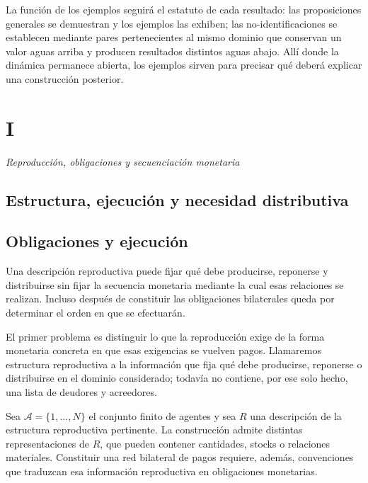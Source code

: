 \documentclass[10pt,a5paper,twoside]{article}
\begin{document}
La función de los ejemplos seguirá el estatuto de cada resultado: las
proposiciones generales se demuestran y los ejemplos las exhiben; las
no-identificaciones se establecen mediante pares pertenecientes al mismo
dominio que conservan un valor aguas arriba y producen resultados distintos
aguas abajo. Allí donde la dinámica permanece abierta, los ejemplos sirven
para precisar qué deberá explicar una construcción posterior.

\cleardoublepage
\setcounter{subsection}{0}
\vspace*{6mm}\section*{I}\label{i.-reproducciuxf3n-obligaciones-y-secuenciaciuxf3n-monetaria}
\thispagestyle{plain}
{\large\itshape Reproducción, obligaciones y secuenciación monetaria\par}\medskip

\subsection*{Estructura, ejecución y necesidad distributiva}\label{estructura-ejecuciuxf3n-y-necesidad-distributiva}

\subsection{Obligaciones y ejecución}\label{obligaciones-y-ejecuciuxf3n}

Una descripción reproductiva puede fijar qué debe producirse, reponerse
y distribuirse sin fijar la secuencia monetaria mediante la cual esas
relaciones se realizan. Incluso después de constituir las obligaciones
bilaterales queda por determinar el orden en que se efectuarán.

El primer problema es distinguir lo que la reproducción exige de la forma monetaria
concreta en que esas exigencias se vuelven pagos. Llamaremos estructura reproductiva a
la información que fija qué debe producirse, reponerse o distribuirse en el dominio
considerado; todavía no contiene, por ese solo hecho, una lista de deudores y acreedores.

Sea \(\mathcal A=\{1,\ldots,N\}\) el conjunto finito de agentes y sea
\(R\) una descripción de la estructura reproductiva pertinente. La
construcción admite distintas representaciones de \(R\), que pueden
contener cantidades, stocks o relaciones materiales. Constituir
una red bilateral de pagos requiere, además, convenciones que traduzcan
esa información reproductiva en obligaciones monetarias.
\end{document}
